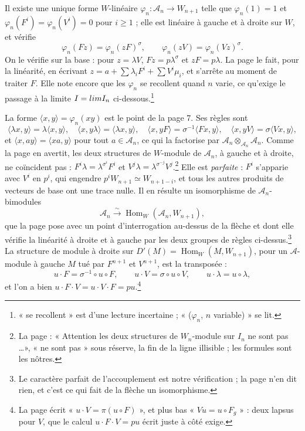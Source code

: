 \documentclass[11pt,a4paper]{article}
\begin{document}
Il existe une unique forme $W$-linéaire $\varphi_n : \mathcal{A}_n \to W_{n+1}$
telle que $\varphi_n(1) = 1$ et $\varphi_n(F^i) = \varphi_n(V^i) = 0$ pour $i
\geq 1$ ; elle est linéaire à gauche et à droite sur $W$, et vérifie
\[
\varphi_n(Fz) = \varphi_n(zF)^\sigma , \qquad \varphi_n(zV) =
\varphi_n(Vz)^\sigma .
\]
On le vérifie sur la base : pour $z = \lambda V$, $Fz = p\lambda^\sigma$ et $zF
= p\lambda$. La page le fait, pour la linéarité, en écrivant $z = a + \sum
\lambda_i F^i + \sum V^i \mu_i$, et s'arrête au moment de traiter $F$. Elle
note encore que les $\varphi_n$ se recollent quand $n$ varie, ce qu'exige le
passage à la limite $I = \varinjlim I_n$ ci-dessous.\footnote{« se
recollent » est d'une lecture incertaine ; « ($\varphi_n$, $n$ variable) »
se lit.}

La forme $\langle x, y \rangle = \varphi_n(xy)$ est le point de la page 7. Ses
règles sont
\[
\langle \lambda x, y \rangle = \lambda \langle x, y \rangle , \quad
\langle x, y \lambda \rangle = \langle \lambda x, y \rangle , \quad
\langle x, yF \rangle = \sigma^{-1}\langle Fx, y \rangle , \quad
\langle x, yV \rangle = \sigma\langle Vx, y \rangle ,
\]
et $\langle x, ay \rangle = \langle xa, y \rangle$ pour tout $a \in
\mathcal{A}_n$, ce qui la factorise par $\mathcal{A}_n \otimes_{\mathcal{A}_n}
\mathcal{A}_n$. Comme la page en avertit, les deux structures de $W$-module de
$\mathcal{A}_n$, à gauche et à droite, ne coïncident pas : $F^i\lambda =
\lambda^{\sigma^i} F^i$ et $V^j \lambda = \lambda^{\sigma^{-j}} V^j$.\footnote{La
page : « Attention les deux structures de $W_n$-module sur $I_n$ ne sont pas
\ldots », « ne sont pas » sous réserve, la fin de la ligne illisible ; les
formules sont les nôtres.} Elle est \emph{parfaite} : $F^i$ s'apparie avec $V^i$ en $p^i$,
qui engendre $p^i W_{n+1} \simeq W_{n+1-i}$, et tous les autres produits de
vecteurs de base ont une trace nulle. Il en résulte un isomorphisme de
$\mathcal{A}_n$-bimodules
\[
\mathcal{A}_n \xrightarrow{\ \sim\ } \operatorname{Hom}_W(\mathcal{A}_n,
W_{n+1}) ,
\]
que la page pose avec un point d'interrogation au-dessus de la flèche et
dont elle vérifie la linéarité à droite et à gauche par les deux groupes de
règles ci-dessus.\footnote{Le caractère parfait de l'accouplement est notre
vérification ; la page n'en dit rien, et c'est ce qui fait de la flèche un
isomorphisme.} La structure de module à droite sur $D'(M) =
\operatorname{Hom}_W(M, W_{n+1})$, pour un $\mathcal{A}$-module à gauche $M$
tué par $F^{n+1}$ et $V^{n+1}$, est la transposée :
\[
u \cdot F = \sigma^{-1} \circ u \circ F , \qquad u \cdot V = \sigma \circ u
\circ V , \qquad u \cdot \lambda = u \circ \lambda ,
\]
et l'on a bien $u \cdot F \cdot V = u \cdot V \cdot F = pu$.\footnote{La page
écrit « $u \cdot V = \pi(u \circ F)$ », et plus bas « $Vu = u \circ F_g$ » :
deux lapsus pour $V$, que le calcul $u \cdot F \cdot V = pu$ écrit juste à
côté exige.}
\end{document}
